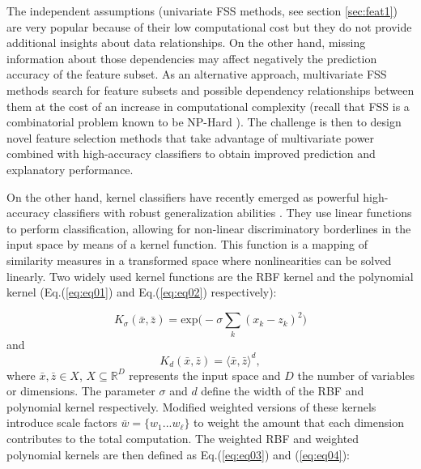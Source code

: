 The independent assumptions (univariate FSS methods, see section \ref{sec:feat1}) are very popular because of their low computational cost\cite{larranaga08} but they do not provide additional insights about data relationships.  On the other hand, missing information about those dependencies may affect negatively the prediction accuracy of the feature subset.  As an alternative approach, multivariate FSS methods search for feature subsets and possible dependency relationships between them at the cost of an increase in computational complexity (recall that FSS is a combinatorial problem known to be NP-Hard \cite{guyon03,rojas05}). The challenge is then to design novel feature selection methods that take advantage of multivariate power combined with high-accuracy classifiers to obtain improved prediction and explanatory performance.

On the other hand, kernel classifiers have recently emerged as powerful high-accuracy classifiers with robust generalization abilities \cite{cristianini04}.  They use linear functions to perform classification, allowing for non-linear discriminatory borderlines in the input space by means of a kernel function. This function is a mapping of similarity measures in a transformed space where nonlinearities can be solved linearly. Two widely used kernel functions are the RBF kernel and the polynomial kernel (Eq.(\ref{eq:eq01}) and Eq.(\ref{eq:eq02}) respectively):

\begin{equation}
	K_{\sigma}(\bar{x},\bar{z}) = \text{exp}\Big( -\sigma\sum_{k} (x_k-z_k)^2 \Big)
	\label{eq:eq01}
\end{equation} and
\begin{equation}
	K_d(\bar{x},\bar{z}) = \langle \bar{x}, \bar{z} \rangle^d,
	\label{eq:eq02}
\end{equation} where \(\bar{x}, \bar{z} \in X\), \(X \subseteq \mathbb{R}^D \) represents the input space and {\scriptsize $D$ } the number of variables or dimensions.  The parameter \(\sigma\) and \(d\) define the width of the RBF and polynomial kernel respectively.  Modified weighted versions of these kernels introduce scale factors \(\bar{w} = \{w_1...w_\ell\}\) to weight the amount that each dimension contributes to the total computation\cite{vapnik02}.  The weighted RBF and weighted polynomial kernels are then defined as Eq.(\ref{eq:eq03}) and (\ref{eq:eq04}):

